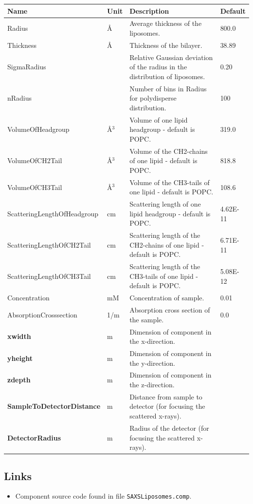 \begin{longtable}{p{}p{}p{}p{}}
\toprule
\textbf{Name} & \textbf{Unit} & \textbf{Description} & \textbf{Default} \\
\midrule
\endhead
Radius & \AA{} & Average thickness of the liposomes. & 800.0 \\
Thickness & \AA{} & Thickness of the bilayer. & 38.89 \\
SigmaRadius &  & Relative Gaussian deviation of the radius in the distribution of liposomes. & 0.20 \\
nRadius &  & Number of bins in Radius for polydisperse distribution. & 100 \\
VolumeOfHeadgroup & \AA{}$^{3}$ & Volume of one lipid headgroup - default is POPC. & 319.0 \\
VolumeOfCH2Tail & \AA{}$^{3}$ & Volume of the CH2-chains of one lipid - default is POPC. & 818.8 \\
VolumeOfCH3Tail & \AA{}$^{3}$ & Volume of the CH3-tails of one lipid - default is POPC. & 108.6 \\
ScatteringLengthOfHeadgroup & cm & Scattering length of one lipid headgroup - default is POPC. & 4.62E-11 \\
ScatteringLengthOfCH2Tail & cm & Scattering length of the CH2-chains of one lipid - default is POPC. & 6.71E-11 \\
ScatteringLengthOfCH3Tail & cm & Scattering length of the CH3-tails of one lipid - default is POPC. & 5.08E-12 \\
Concentration & mM & Concentration of sample. & 0.01 \\
AbsorptionCrosssection & 1/m & Absorption cross section of the sample. & 0.0 \\
\textbf{xwidth} & m & Dimension of component in the x-direction. &  \\
\textbf{yheight} & m & Dimension of component in the y-direction. &  \\
\textbf{zdepth} & m & Dimension of component in the z-direction. &  \\
\textbf{SampleToDetectorDistance} & m & Distance from sample to detector (for focusing the scattered x-rays). &  \\
\textbf{DetectorRadius} & m & Radius of the detector (for focusing the scattered x-rays). &  \\
\bottomrule
\end{longtable}

\subsection*{Links}
\begin{itemize}
  \item Component source code found in file \texttt{SAXSLiposomes.comp}.
\end{itemize}
